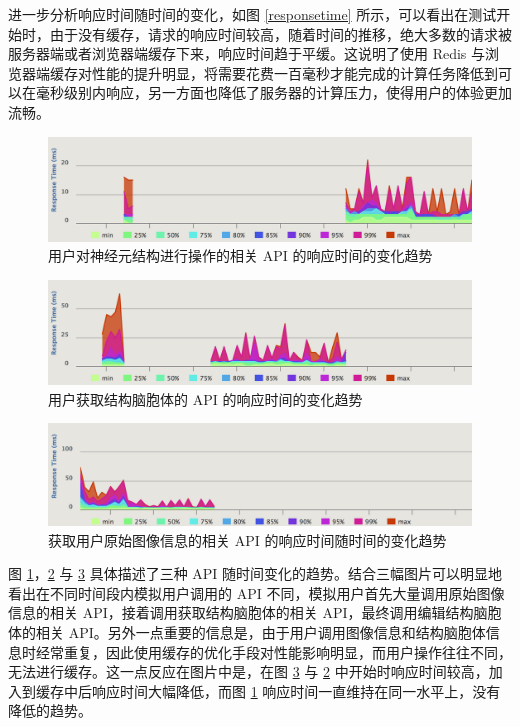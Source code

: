 进一步分析响应时间随时间的变化，如图 \ref{responsetime} 所示，可以看出在测试开始时，由于没有缓存，请求的响应时间较高，随着时间的推移，绝大多数的请求被服务器端或者浏览器端缓存下来，响应时间趋于平缓。这说明了使用 Redis 与浏览器端缓存对性能的提升明显，将需要花费一百毫秒才能完成的计算任务降低到可以在毫秒级别内响应，另一方面也降低了服务器的计算压力，使得用户的体验更加流畅。

\begin{figure}[!ht]
\centering
\includegraphics[width=148mm]{images/operation-res}
\caption{用户对神经元结构进行操作的相关 API 的响应时间的变化趋势}
\label{operation-res}
\end{figure}

\begin{figure}[!ht]
\centering
\includegraphics[width=148mm]{images/swc-c-res}
\caption{用户获取结构脑胞体的 API 的响应时间的变化趋势}
\label{swc-c-res}
\end{figure}

\begin{figure}[!ht]
\centering
\includegraphics[width=148mm]{images/image-res}
\caption{获取用户原始图像信息的相关 API 的响应时间随时间的变化趋势}
\label{image-res}
\end{figure}

图 \ref{operation-res}，\ref{swc-c-res} 与 \ref{image-res} 具体描述了三种 API 随时间变化的趋势。结合三幅图片可以明显地看出在不同时间段内模拟用户调用的 API 不同，模拟用户首先大量调用原始图像信息的相关 API，接着调用获取结构脑胞体的相关 API，最终调用编辑结构脑胞体的相关 API。另外一点重要的信息是，由于用户调用图像信息和结构脑胞体信息时经常重复，因此使用缓存的优化手段对性能影响明显，而用户操作往往不同，无法进行缓存。这一点反应在图片中是，在图 \ref{image-res} 与 \ref{swc-c-res} 中开始时响应时间较高，加入到缓存中后响应时间大幅降低，而图 \ref{operation-res} 响应时间一直维持在同一水平上，没有降低的趋势。

